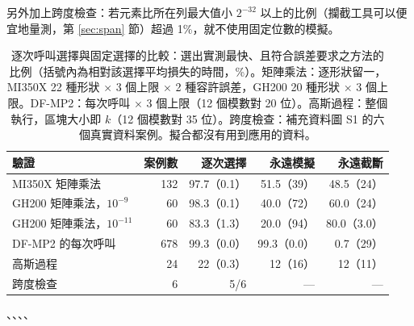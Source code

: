 另外加上跨度檢查：若元素比所在列最大值小 $2^{-32}$ 以上的比例（攔截工具可以便宜地量測，第 \ref{sec:span} 節）超過 1\%，就不使用固定位數的模擬。

\begin{table}[tbp]
\centering
\caption[逐次呼叫選擇與固定選擇的比較]{逐次呼叫選擇與固定選擇的比較：選出實測最快、且符合誤差要求之方法的比例（括號內為相對該選擇平均損失的時間，\%）。矩陣乘法：逐形狀留一，MI350X 22 種形狀 × 3 個上限 × 2 種容許誤差，GH200 20 種形狀 × 3 個上限。DF-MP2：每次呼叫 × 3 個上限（12 個模數對 20 位）。高斯過程：整個執行，區塊大小即 $k$（12 個模數對 35 位）。跨度檢查：補充資料圖 S1 的六個真實資料案例。擬合都沒有用到應用的資料。}\label{tab:mi-selector}
\small
\begin{tabular}{@{}lrrrr@{}}
\toprule
驗證 & 案例數 & 逐次選擇 & 永遠模擬 & 永遠截斷 \\
\midrule
MI350X 矩陣乘法 & 132 & 97.7（0.1） & 51.5（39） & 48.5（24） \\
GH200 矩陣乘法，$10^{-9}$ & 60 & 98.3（0.1） & 40.0（72） & 60.0（24） \\
GH200 矩陣乘法，$10^{-11}$ & 60 & 83.3（1.3） & 20.0（94） & 80.0（3.0） \\
DF-MP2 的每次呼叫 & 678 & 99.3（0.0） & 99.3（0.0） & 0.7（29） \\
高斯過程 & 24 & 22（0.3） & 12（16） & 12（11） \\
跨度檢查 & 6 & 5/6 & — & — \\
\bottomrule
\end{tabular}
\begin{figsource}、、、、\end{figsource}
\end{table}

